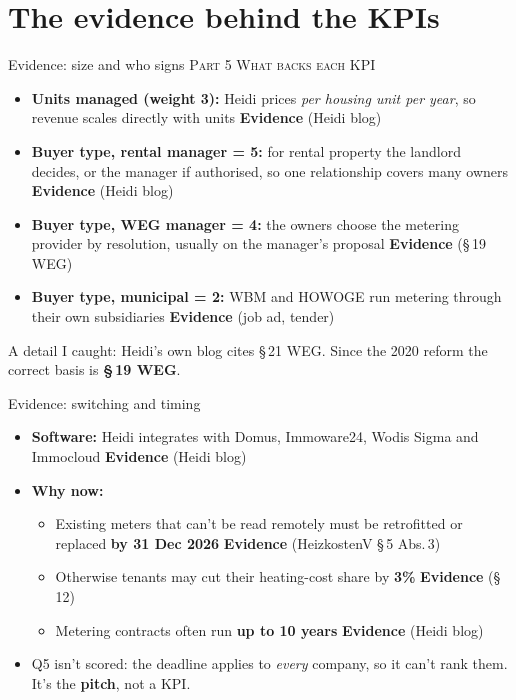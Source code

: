 \documentclass[aspectratio=169,11pt]{beamer}
\newcommand{\ev}{\textcolor{accent}{\textbf{Evidence}}}
\newcommand{\partlabel}[1]{{\small\color{assume}\textsc{#1}}\par\vspace{0.3em}}
\begin{document}
\section{The evidence behind the KPIs}

\begin{frame}{Evidence: size and who signs}
  \partlabel{Part 5 \textbullet{} What backs each KPI}
  \begin{itemize}
    \item \textbf{Units managed (weight 3):} Heidi prices \emph{per housing unit per year}, so
          revenue scales directly with units \hfill \ev{} (Heidi blog)
    \item \textbf{Buyer type, rental manager = 5:} for rental property the landlord decides,
          or the manager if authorised, so one relationship covers many owners
          \hfill \ev{} (Heidi blog)
    \item \textbf{Buyer type, WEG manager = 4:} the owners choose the metering provider by
          resolution, usually on the manager's proposal \hfill \ev{} (\S\,19 WEG)
    \item \textbf{Buyer type, municipal = 2:} WBM and HOWOGE run metering through their own
          subsidiaries \hfill \ev{} (job ad, tender)
  \end{itemize}
  \vspace{0.4em}
  \small A detail I caught: Heidi's own blog cites \S\,21 WEG. Since the 2020 reform the
  correct basis is \textbf{\S\,19 WEG}.
\end{frame}

\begin{frame}{Evidence: switching and timing}
  \begin{itemize}
    \item \textbf{Software:} Heidi integrates with Domus, Immoware24, Wodis Sigma and
          Immocloud \hfill \ev{} (Heidi blog)
    \item \textbf{Why now:}
      \begin{itemize}
        \item Existing meters that can't be read remotely must be retrofitted or replaced
              \textbf{by 31 Dec 2026} \hfill \ev{} (HeizkostenV \S\,5 Abs.\,3)
        \item Otherwise tenants may cut their heating-cost share by \textbf{3\%}
              \hfill \ev{} (\S\,12)
        \item Metering contracts often run \textbf{up to 10 years} \hfill \ev{} (Heidi blog)
      \end{itemize}
    \item Q5 isn't scored: the deadline applies to \emph{every} company, so it can't rank them.
          It's the \textbf{pitch}, not a KPI.
  \end{itemize}
\end{frame}
\end{document}
